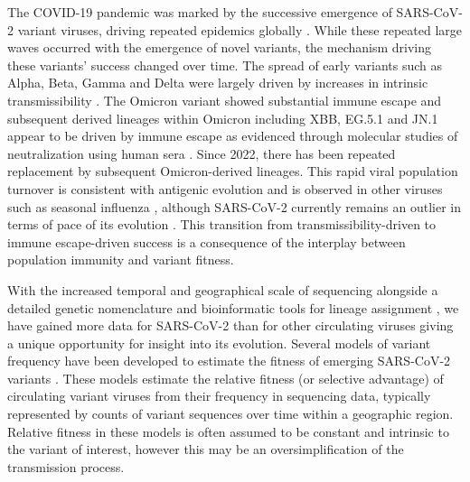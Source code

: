 \documentclass[12pt,oneside,letterpaper]{article}
\begin{document}
The COVID-19 pandemic was marked by the successive emergence of SARS-CoV-2 variant viruses, driving repeated epidemics globally \cite{tegally2021detection, Volz2021}.
While these repeated large waves occurred with the emergence of novel variants, the mechanism driving these variants' success changed over time.
The spread of early variants such as Alpha, Beta, Gamma and Delta were largely driven by increases in intrinsic transmissibility \cite{carabelli2023sars}.
The Omicron variant showed substantial immune escape \cite{carabelli2023sars} and subsequent derived lineages within Omicron including XBB, EG.5.1 and JN.1 appear to be driven by immune escape as evidenced through molecular studies of neutralization using human sera \cite{Cao2021, Cao2022, Bekliz2024, Jian2023}.
Since 2022, there has been repeated replacement by subsequent Omicron-derived lineages.
This rapid viral population turnover is consistent with antigenic evolution and is observed in other viruses such as seasonal influenza \cite{bedford2014integrating}, although SARS-CoV-2 currently remains an outlier in terms of pace of its evolution \cite{kistler2023atlas}.
This transition from transmissibility-driven to immune escape-driven success is a consequence of the interplay between population immunity and variant fitness.


With the increased temporal and geographical scale of sequencing alongside a detailed genetic nomenclature \cite{rambaut2020dynamic} and bioinformatic tools for lineage assignment \cite{turakhia2021ultrafast, aksamentov2021nextclade}, we have gained more data for SARS-CoV-2 than for other circulating viruses giving a unique opportunity for insight into its evolution.
Several models of variant frequency have been developed to estimate the fitness of emerging SARS-CoV-2 variants \cite{Annavajhala2021, Piantham2022, figgins2022sars, susswein2023leveraging, Lefrancq2023, abousamra2024fitness}.
These models estimate the relative fitness (or selective advantage) of circulating variant viruses from their frequency in sequencing data, typically represented by counts of variant sequences over time within a geographic region.
Relative fitness in these models is often assumed to be constant and intrinsic to the variant of interest, however this may be an oversimplification of the transmission process.
\end{document}
